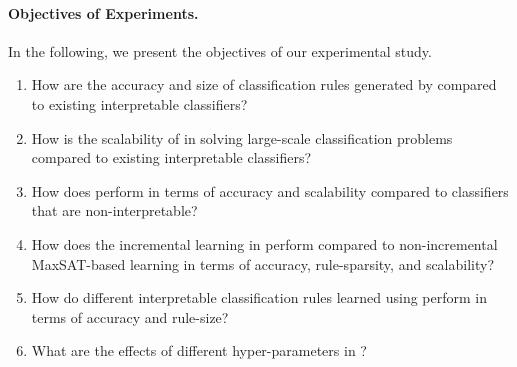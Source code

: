 \paragraph{Objectives of Experiments.} In the following, we present the objectives of our experimental study. 

\begin{enumerate}
	\item How are the accuracy and size of classification rules generated by  {\imli} compared to existing interpretable classifiers?
	\item How is the scalability of {\imli} in solving large-scale classification problems compared to existing interpretable classifiers?
	\item How does {\imli} perform in terms of accuracy and scalability compared to classifiers that are non-interpretable? 
	\item How does the incremental learning in {\imli} perform compared to non-incremental MaxSAT-based learning in terms of accuracy, rule-sparsity, and scalability?
	\item How do different interpretable classification rules learned using {\imli} perform in terms of accuracy and rule-size?
	\item What are the effects of different hyper-parameters in {\imli}?
\end{enumerate} 

